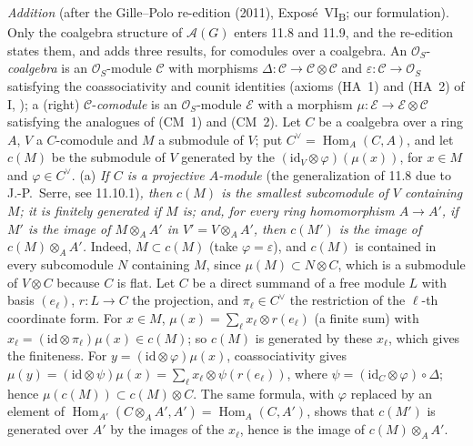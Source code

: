 \par\medskip\noindent
\emph{Addition} (after the Gille--Polo re-edition (2011), Expos\'e~VI\textsubscript{B}; our formulation).
Only the coalgebra structure of \(\mathcal A(G)\) enters 11.8 and 11.9, and the re-edition states them, and adds
three results, for comodules over a coalgebra. An \(\mathcal O_S\)-\emph{coalgebra} is an \(\mathcal O_S\)-module
\(\mathcal C\) with morphisms \(\Delta\colon\mathcal C\to\mathcal C\otimes\mathcal C\) and
\(\varepsilon\colon\mathcal C\to\mathcal O_S\) satisfying the coassociativity and counit identities (axioms (HA~1)
and (HA~2) of I, ); a (right) \(\mathcal C\)-\emph{comodule} is an
\(\mathcal O_S\)-module \(\mathcal E\) with a morphism \(\mu\colon\mathcal E\to\mathcal E\otimes\mathcal C\) satisfying
the analogues of (CM~1) and (CM~2). Let \(C\) be a coalgebra over a ring \(A\), \(V\) a \(C\)-comodule and \(M\) a
submodule of \(V\); put \(C^\vee=\operatorname{Hom}_A(C,A)\), and let \(c(M)\) be the submodule of \(V\) generated
by the \((\mathrm{id}_V\otimes\varphi)(\mu(x))\), for \(x\in M\) and \(\varphi\in C^\vee\).
(a) \emph{If \(C\) is a projective \(A\)-module} (the generalization of 11.8 due to J.-P.~Serre, see
11.10.1)\emph{, then \(c(M)\) is the smallest subcomodule of \(V\) containing \(M\); it is finitely generated if
\(M\) is; and, for every ring homomorphism \(A\to A'\), if \(M'\) is the image of \(M\otimes_AA'\) in
\(V'=V\otimes_AA'\), then \(c(M')\) is the image of \(c(M)\otimes_AA'\).} Indeed, \(M\subset c(M)\) (take
\(\varphi=\varepsilon\)), and \(c(M)\) is contained in every subcomodule \(N\) containing \(M\), since
\(\mu(M)\subset N\otimes C\), which is a submodule of \(V\otimes C\) because \(C\) is flat. Let \(C\) be a direct
summand of a free module \(L\) with basis \((e_\ell)\), \(r\colon L\to C\) the projection, and \(\pi_\ell\in C^\vee\)
the restriction of the \(\ell\)-th coordinate form. For \(x\in M\), \(\mu(x)=\sum_\ell x_\ell\otimes r(e_\ell)\)
(a finite sum) with \(x_\ell=(\mathrm{id}\otimes\pi_\ell)\mu(x)\in c(M)\); so \(c(M)\) is generated by these
\(x_\ell\), which gives the finiteness. For \(y=(\mathrm{id}\otimes\varphi)\mu(x)\), coassociativity gives
\(\mu(y)=(\mathrm{id}\otimes\psi)\mu(x)=\sum_\ell x_\ell\otimes\psi(r(e_\ell))\), where
\(\psi=(\mathrm{id}_C\otimes\varphi)\circ\Delta\); hence \(\mu(c(M))\subset c(M)\otimes C\). The same formula, with
\(\varphi\) replaced by an element of \(\operatorname{Hom}_{A'}(C\otimes_AA',A')=\operatorname{Hom}_A(C,A')\), shows
that \(c(M')\) is generated over \(A'\) by the images of the \(x_\ell\), hence is the image of \(c(M)\otimes_AA'\).
